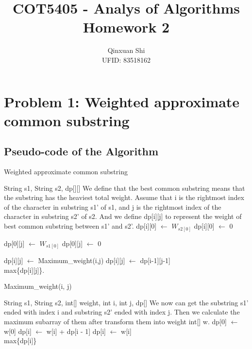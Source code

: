 \documentclass[]{article}
\title{\Huge COT5405 - Analys of Algorithms \\ Homework 2}
\author{Qinxuan Shi \\ UFID: 83518162}
\date{}
\begin{document}
	
	\maketitle
	\clearpage
	
	\section{Problem 1: Weighted approximate common substring}
	\subsection{Pseudo-code of the Algorithm}
	\begin{algorithm}  
		\caption{Weighted approximate common substring}  
		\begin{algorithmic} 
			\Require String s1, String s2, dp[][]
			\Ensure
			\State We define that the best common substring means that the substring has the heaviest total weight.
			\State Assume that i is the rightmost index of the character in substring s1' of s1, and j is the rightmost index of the character in substring s2' of s2. And we define dp[i][j] to represent the weight of best common substring between s1' and s2'.
					\State dp[i][0] $\leftarrow$ $W_{s2[0]}$
				\Else
					\State dp[i][0] $\leftarrow$ 0
				\EndIf
			\EndFor
			
					\State dp[0][j] $\leftarrow$ $W_{s1[0]}$
				\Else
					\State dp[0][j] $\leftarrow$ 0
				\EndIf
			\EndFor
			
						\State dp[i][j] $\leftarrow$ Maximum\_weight(i,j)
					\Else
						\State dp[i][j] $\leftarrow$ dp[i-1][j-1]
					\EndIf
				\EndFor
			\EndFor\\
			\Return max\{dp[i][j]\}.
		\end{algorithmic}  
	\end{algorithm} 

	\begin{algorithm}[H]  
		\caption{Maximum\_weight(i, j)}  
		\begin{algorithmic} 
			\Require String s1, String s2, int[] weight, int i, int j, dp[]
			\Ensure
			\State We now can get the substring s1' ended with index i and substring s2' ended with index j. Then we calculate the maximum subarray of them after transform them into weight int[] w.
			\If{t=0}
				\State dp[0] $\leftarrow$ w[0]
			\EndIf
			\For{i = 1 to w.length}
				\If{dp[i - 1] \textgreater 0}
					\State dp[i] $\leftarrow$ w[i] + dp[i - 1]
				\Else
					\State dp[i] $\leftarrow$ w[i]
				\EndIf
			\EndFor\\
			\Return max\{dp[i]\}
		\end{algorithmic}  
	\end{algorithm} 
\end{document}
